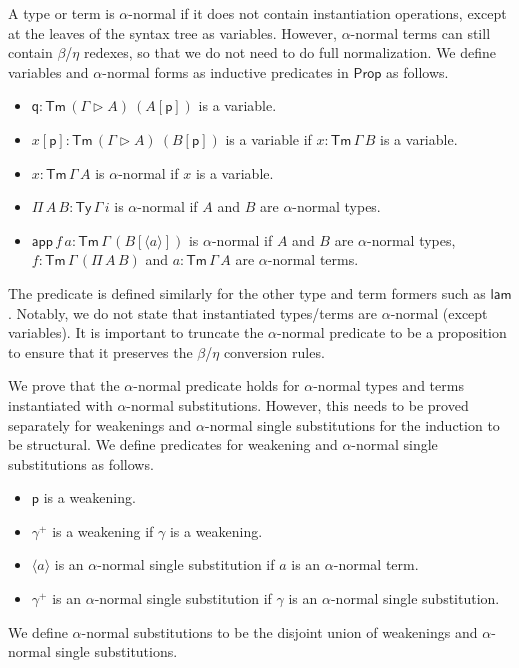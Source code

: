 \documentclass[a4paper,UKenglish,cleveref, autoref, thm-restate]{lipics-v2021}
\newcommand{\Prop}{\mathsf{Prop}}
\newcommand{\Ty}{\mathsf{Ty}}
\newcommand{\Tm}{\mathsf{Tm}}
\newcommand{\p}{\mathsf{p}}
\newcommand{\q}{\mathsf{q}}
\newcommand{\ext}{\mathop{\triangleright}}
\newcommand{\lam}{\mathsf{lam}}
\newcommand{\app}{\mathsf{app}}
\begin{document}
A type or term is $\alpha$-normal if it does not contain instantiation
operations, except at the leaves of the syntax tree as variables. However,
$\alpha$-normal terms can still contain $\beta$/$\eta$ redexes, so that we do
not need to do full normalization. We define variables and $\alpha$-normal forms
as inductive predicates in $\Prop$ as follows.
\begin{itemize}
  \item $\q:\Tm\,(\Gamma\ext A)\ (A[\p])$ is a variable.
  \item $x[\p]:\Tm\,(\Gamma\ext A)\ (B[\p])$ is a variable if $x:\Tm\,\Gamma\,B$
  is a variable.
  \item $x:\Tm\,\Gamma\,A$ is $\alpha$-normal if $x$ is a variable.
  \item $\Pi\,A\,B:\Ty\,\Gamma\,i$ is $\alpha$-normal if $A$ and $B$ are
  $\alpha$-normal types.
  \item $\app\,f\,a:\Tm\,\Gamma\,(B[\langle a \rangle])$ is $\alpha$-normal if
  $A$ and $B$ are $\alpha$-normal types, $f:\Tm\,\Gamma\,(\Pi\,A\,B)$ and
  $a:\Tm\,\Gamma\,A$ are $\alpha$-normal terms.
\end{itemize}
The predicate is defined similarly for the other type and term formers such as
$\lam$. Notably, we do not state that instantiated types/terms are
$\alpha$-normal (except variables). It is important to truncate the
$\alpha$-normal predicate to be a proposition to ensure that it preserves the
$\beta$/$\eta$ conversion rules.

We prove that the $\alpha$-normal predicate holds for $\alpha$-normal types and
terms instantiated with $\alpha$-normal substitutions. However, this needs to be
proved separately for weakenings and $\alpha$-normal single substitutions for
the induction to be structural. We define predicates for weakening and
$\alpha$-normal single substitutions as follows.
\begin{itemize}
  \item $\p$ is a weakening.
  \item $\gamma^+$ is a weakening if $\gamma$ is a weakening.
  \item $\langle a \rangle$ is an $\alpha$-normal single substitution if $a$ is an
  $\alpha$-normal term.
  \item $\gamma^+$ is an $\alpha$-normal single substitution if $\gamma$ is an
  $\alpha$-normal single substitution.
\end{itemize}
We define $\alpha$-normal substitutions to be the disjoint union of weakenings
and $\alpha$-normal single substitutions.
\end{document}
